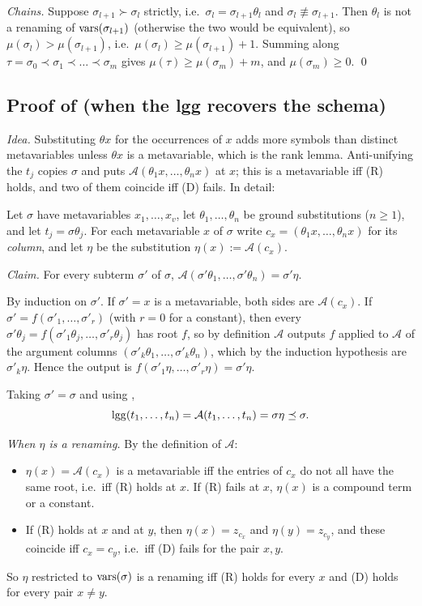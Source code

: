 \emph{Chains.} Suppose $\sigma_{l+1}\succ\sigma_l$ strictly, i.e.\
$\sigma_l=\sigma_{l+1}\theta_l$ and $\sigma_l\not\equiv\sigma_{l+1}$. Then
$\theta_l$ is not a renaming of $\mathrm{vars}(\sigma_{l+1})$ (otherwise the two would be
equivalent), so $\mu(\sigma_l)>\mu(\sigma_{l+1})$, i.e.\
$\mu(\sigma_l)\ge\mu(\sigma_{l+1})+1$. Summing along
$\tau=\sigma_0\prec\sigma_1\prec\dots\prec\sigma_m$ gives
$\mu(\tau)\ge\mu(\sigma_m)+m$, and $\mu(\sigma_m)\ge0$. \qed

\subsection{Proof of \texorpdfstring{}{the recovery lemma} (when the lgg recovers the schema)}

\emph{Idea.} Substituting $\theta x$ for the occurrences of $x$ adds more symbols
than distinct metavariables unless $\theta x$ is a metavariable, which is the rank
lemma. Anti-unifying the $t_j$ copies $\sigma$ and puts
$\mathcal A(\theta_1x,\dots,\theta_nx)$ at $x$; this is a metavariable iff (R)
holds, and two of them coincide iff (D) fails. In detail:

Let $\sigma$ have metavariables $x_1,\dots,x_v$, let $\theta_1,\dots,\theta_n$ be
ground substitutions ($n\ge1$), and let $t_j=\sigma\theta_j$. For each
metavariable $x$ of $\sigma$ write $c_x=(\theta_1x,\dots,\theta_nx)$ for its
\emph{column}, and let $\eta$ be the substitution $\eta(x):=\mathcal A(c_x)$.

\emph{Claim.} For every subterm $\sigma'$ of $\sigma$,
$\mathcal A(\sigma'\theta_1,\dots,\sigma'\theta_n)=\sigma'\eta$.

By induction on $\sigma'$. If $\sigma'=x$ is a metavariable, both sides are
$\mathcal A(c_x)$. If $\sigma'=f(\sigma'_1,\dots,\sigma'_r)$ (with $r=0$ for a
constant), then every $\sigma'\theta_j=f(\sigma'_1\theta_j,\dots,\sigma'_r\theta_j)$
has root $f$, so by definition $\mathcal A$ outputs $f$ applied to
$\mathcal A$ of the argument columns $(\sigma'_k\theta_1,\dots,\sigma'_k\theta_n)$,
which by the induction hypothesis are $\sigma'_k\eta$. Hence the output is
$f(\sigma'_1\eta,\dots,\sigma'_r\eta)=\sigma'\eta$.

Taking $\sigma'=\sigma$ and using ,
\[
  \mathrm{lgg}(t_1,\dots,t_n)=\mathcal A(t_1,\dots,t_n)=\sigma\eta\preceq\sigma .
\]

\emph{When $\eta$ is a renaming.} By the definition of $\mathcal A$:
\begin{itemize}
\item $\eta(x)=\mathcal A(c_x)$ is a metavariable iff the entries of $c_x$ do not
  all have the same root, i.e.\ iff (R) holds at $x$. If (R) fails at $x$,
  $\eta(x)$ is a compound term or a constant.
\item If (R) holds at $x$ and at $y$, then $\eta(x)=z_{c_x}$ and $\eta(y)=z_{c_y}$,
  and these coincide iff $c_x=c_y$, i.e.\ iff (D) fails for the pair $x,y$.
\end{itemize}
So $\eta$ restricted to $\mathrm{vars}(\sigma)$ is a renaming iff (R) holds for every $x$
and (D) holds for every pair $x\neq y$.

